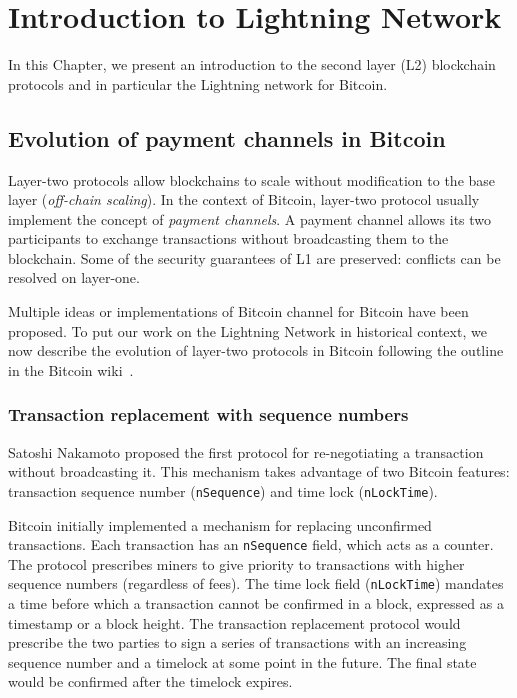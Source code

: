 \chapter{Introduction to Lightning Network}

\label{Chapter05IntroLightning}

In this Chapter, we present an introduction to the second layer (L2) blockchain protocols and in particular the Lightning network for Bitcoin.


\section{Evolution of payment channels in Bitcoin}

Layer-two protocols allow blockchains to scale without modification to the base layer (\textit{off-chain scaling}).
In the context of Bitcoin, layer-two protocol usually implement the concept of \textit{payment channels}.
A payment channel allows its two participants to exchange transactions without broadcasting them to the blockchain.
Some of the security guarantees of L1 are preserved: conflicts can be resolved on layer-one.

Multiple ideas or implementations of Bitcoin channel for Bitcoin have been proposed.
To put our work on the Lightning Network in historical context, we now describe the evolution of layer-two protocols in Bitcoin following the outline in the Bitcoin wiki~\cite{BitcoinWikiChannels}.

\subsection{Transaction replacement with sequence numbers}

Satoshi Nakamoto proposed the first protocol for re-negotiating a transaction without broadcasting it.
This mechanism takes advantage of two Bitcoin features: transaction sequence number (\texttt{nSequence}) and time lock (\texttt{nLockTime}).

Bitcoin initially implemented a mechanism for replacing unconfirmed transactions.
Each transaction has an \texttt{nSequence} field, which acts as a counter.
The protocol prescribes miners to give priority to transactions with higher sequence numbers (regardless of fees).
The time lock field (\texttt{nLockTime}) mandates a time before which a transaction cannot be confirmed in a block, expressed as a timestamp or a block height.
The transaction replacement protocol would prescribe the two parties to sign a series of transactions with an increasing sequence number and a timelock at some point in the future.
The final state would be confirmed after the timelock expires.

